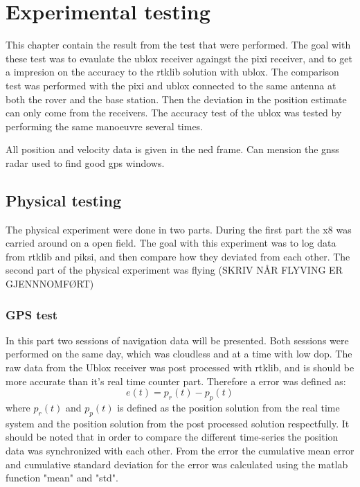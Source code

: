 
\chapter{Experimental testing}
This chapter contain the result from the test that were performed. The goal with these test was to evaulate the ublox receiver againgst the pixi receiver, and to get a impresion on the accuracy to the rtklib solution with ublox. The comparison test was performed with the pixi and ublox connected to the same antenna at both the rover and the base station. Then the deviation in the position estimate can only come from the receivers. The accuracy test of the ublox was tested by performing the same manoeuvre several times.

All position and velocity data is given in the \gls{ned} frame. 
Can mension the gnss radar used to find good gps windows.
\section{Physical testing}
The physical experiment were done in two parts. During the first part the x8 was carried around on a open field. The goal with this experiment was to log data from rtklib and piksi, and then compare how they deviated from each other. The second part of the physical experiment was flying (SKRIV NÅR FLYVING ER GJENNNOMFØRT)

\subsection{GPS test}
In this part two sessions of navigation data will be presented. Both sessions were performed on the same day, which was cloudless and at a time with low \gls{dop}. The raw data from the Ublox receiver was post processed with rtklib, and is should be more accurate than it's real time counter part. Therefore a error was defined as:
\begin{equation}
e(t) = p_r(t) - p_p(t)
\end{equation}
where $p_r(t)$ and $p_p(t)$ is defined as the position solution from the real time system and the position solution from the post processed solution respectfully. It should be noted that in order to compare the different time-series the position data was synchronized with each other. From the error the cumulative mean error and cumulative standard deviation for the error was calculated using the matlab function "mean" and "std".

